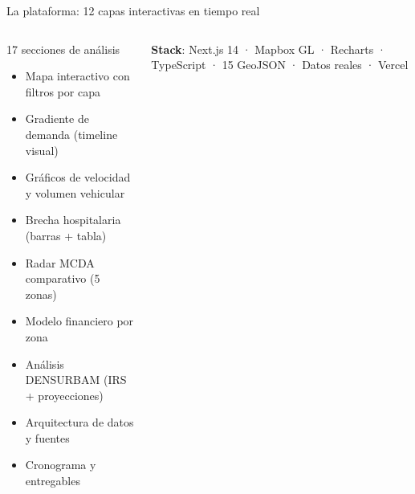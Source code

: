 \documentclass[aspectratio=169, 11pt]{beamer}
\begin{document}
{\begin{frame}{La plataforma: 12 capas interactivas en tiempo real}
\begin{columns}[T]
\begin{exampleblock}{\small 17 secciones de análisis}
\scriptsize
\begin{itemize}\setlength{\itemsep}{0pt}
  \item Mapa interactivo con filtros por capa
  \item Gradiente de demanda (timeline visual)
  \item Gráficos de velocidad y volumen vehicular
  \item Brecha hospitalaria (barras + tabla)
  \item Radar MCDA comparativo (5 zonas)
  \item Modelo financiero por zona
  \item Análisis DENSURBAM (IRS + proyecciones)
  \item Arquitectura de datos y fuentes
  \item Cronograma y entregables
\end{itemize}
\end{exampleblock}

\vspace{1pt}
{\scriptsize\textbf{Stack}: Next.js 14 · Mapbox GL · Recharts · TypeScript · 15 GeoJSON · Datos reales · Vercel}
\end{columns}
\end{frame}
}
\end{document}
